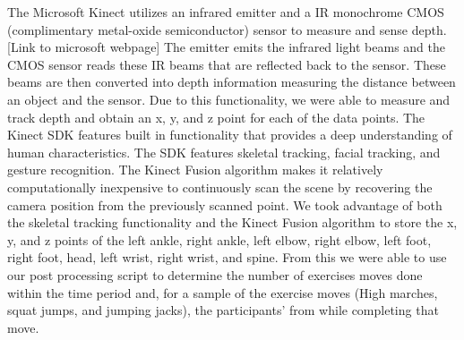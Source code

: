 The Microsoft Kinect utilizes an infrared emitter and a IR monochrome CMOS (complimentary metal-oxide semiconductor) sensor to measure and sense depth. [Link to microsoft webpage]  The emitter emits the infrared light beams and the CMOS sensor reads these IR beams that are reflected back to the sensor.  These beams are then converted into depth information measuring the distance between an object and the sensor.  Due to this functionality, we were able to measure and track depth and obtain an x, y, and z point for each of the data points.  The Kinect SDK features built in functionality that provides a deep understanding of human characteristics.  The SDK features skeletal tracking, facial tracking, and gesture recognition.  The Kinect Fusion algorithm makes it relatively computationally inexpensive to continuously scan the scene by recovering the camera position from the previously scanned point.  We took advantage of both the skeletal tracking functionality and the Kinect Fusion algorithm to store the x, y, and z points of the left ankle, right ankle, left elbow, right elbow, left foot, right foot, head, left wrist, right wrist, and spine.  From this we were able to use our post processing script to determine the number of exercises moves done within the time period and, for a sample of the exercise moves (High marches, squat jumps, and jumping jacks), the participants' from while completing that move.